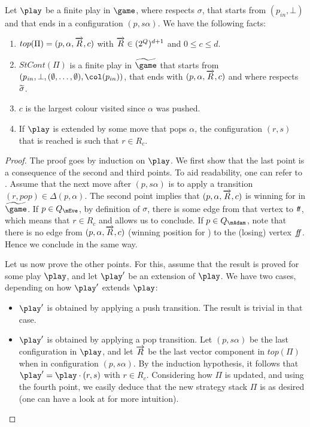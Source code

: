 \begin{lemma}\label{10-ini:lemma:games:ReturningSets_paritexp}
Let $\play$ be a finite play in $\game$, where \Eve respects
$\sigma$, that starts from $(p_{\mathit in},\bot)$ and
that ends in a configuration $(p,s\alpha)$. We have the
following facts:

\begin{enumerate}

\item $top(\Pi)=(p,\alpha,\overrightarrow{R},c)$ with
$\overrightarrow{R}\in(2^Q)^{d+1}$ and $0\leq c\leq d$.

\item $StCont(\Pi)$ is a finite play in $\fgame$ that starts
from $(p_{\mathit in},\bot,(\emptyset,\dots,\emptyset),\pdscol{p_{in}})$,
that ends with $(p,\alpha,\overrightarrow{R},c)$ and where
\Eve respects $\widetilde{\sigma}$.

\item $c$ is the largest colour visited since $\alpha$ was pushed.

\item If $\play$ is extended by some move
that pops $\alpha$, the configuration $(r,s)$ that is reached
is such that $r\in R_c$.
\end{enumerate}
\end{lemma}


\begin{proof}
The proof goes by induction on $\play$. We first show that the
last point is a consequence of the second and third points. To aid readability, one can refer to 
. Assume that
the next move after $(p,s\alpha)$ is to apply a transition
$(r,pop)\in\Delta(p,\alpha)$. The second point implies that
$(p,\alpha,\overrightarrow{R},c)$ is winning for \Eve in
$\fgame$. If $p\in Q_\mEve$, by definition of $\sigma$, there is
some edge from that vertex to $t\! t$, which means that
$r\in R_c$ and allows us to conclude. If $p\in Q_\mAdam$, note that there is no
edge from $(p,\alpha,\overrightarrow{R},c)$ (winning position
for \Eve) to the (losing) vertex $f\!\! f$. Hence we
conclude in the same way.

Let us now prove the other points. For this, assume that the
result is proved for some play $\play$, and let $\play'$ be an
extension of $\play$. We have two cases, depending on how $\play'$
extends $\play$:

\begin{itemize}
\item $\play'$ is obtained by applying a push transition. The result is trivial in that case.

\item $\play'$ is obtained by applying a pop transition. Let
$(p,s\alpha)$ be the last configuration in $\play$, and let
$\overrightarrow{R}$ be the last vector component in $top(\Pi)$ when
in configuration $(p,s\alpha)$. By the induction
hypothesis, it follows that $\play'=\play\cdot(r,s)$ with
$r\in R_c$. Considering how $\Pi$ is updated, and
using the fourth point, we easily deduce that the new strategy
stack $\Pi$ is as desired (one can have a look at 
 for more
intuition).
\end{itemize}
\end{proof}

